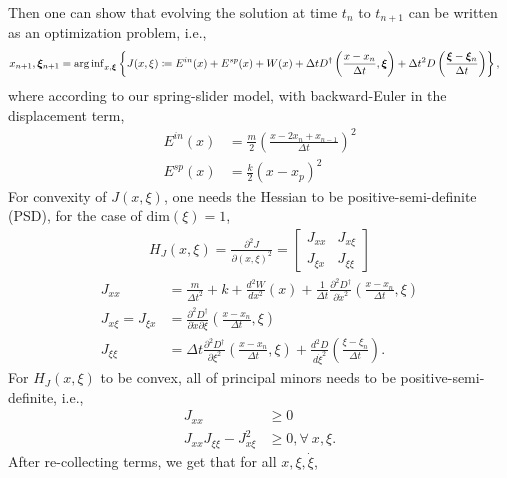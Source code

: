 Then one can show that evolving the solution at time $t_n$ to $t_{n+1}$ can be written as an optimization problem, i.e., 
\begin{align}
    x_{n+1}, \bm{\xi}_{n+1} &= \operatorname{arg\,inf}_{x, \bm{\xi}} \left\{J(x, \xi) \coloneqq E^{in}(x) + E^{sp}(x) + W(x) + \Delta t D^\dagger\left(\frac{x - x_n}{\Delta t}, \bm{\xi}\right) + \Delta t^2 D\left(\frac{\bm{\xi}-\bm{\xi}_n}{\Delta t}\right)\right\},  \label{eq:nToNPlusOneDotX}
\end{align}
where according to our spring-slider model, 
with backward-Euler in the displacement term, 
\begin{align}
    E^{in} (x) &= \frac{m}{2} \left(\frac{x - 2x_n + x_{n-1}}{\Delta t}\right)^2 \\
    E^{sp}(x) &= \frac{k}{2} \left(x - x_p\right)^2
\end{align}
For convexity of $J(x, \xi)$, 
one needs the Hessian to be positive-semi-definite (PSD), 
for the case of $\text{dim}(\xi) = 1$, 
\begin{align*}
    H_J(x, \xi) = \frac{\partial^2 J}{\partial (x, \xi)^2} = 
    \begin{bmatrix}
     J_{xx} & J_{x\xi} \\
     J_{\xi x} & J_{\xi \xi}
    \end{bmatrix}
\end{align*}
\begin{align}
    J_{xx} &= \frac{m}{\Delta t^2} + k + \frac{d^2 W}{d x^2}(x) + \frac{1}{\Delta t} \frac{\partial^2 D^\dagger}{\partial \dot{x}^2}\left(\frac{x - x_n}{\Delta t}, \xi \right) \\
    J_{x\xi} = J_{\xi x} &= \frac{\partial^2 D^\dagger}{\partial \dot{x} \partial \xi} \left(\frac{x - x_n}{\Delta t}, \xi \right) \\
    J_{\xi \xi} &= \Delta t \frac{\partial^2 D^\dagger}{\partial \xi^2} \left(\frac{x - x_n}{\Delta t}, \xi \right) + \frac{d^2 D}{d \dot{\xi}^2}\left(\frac{\xi - \xi_n}{\Delta t}\right). 
\end{align}
For $H_J(x, \xi)$ to be convex, 
all of principal minors needs to be positive-semi-definite, 
i.e., 
\begin{align*}
    J_{xx} &\ge 0 \\
    J_{xx} J_{\xi\xi} - J_{x\xi}^2 &\ge 0, \forall\ x, \xi.
\end{align*}
After re-collecting terms, 
we get that for all $x, \xi, \dot{\xi}$, 
